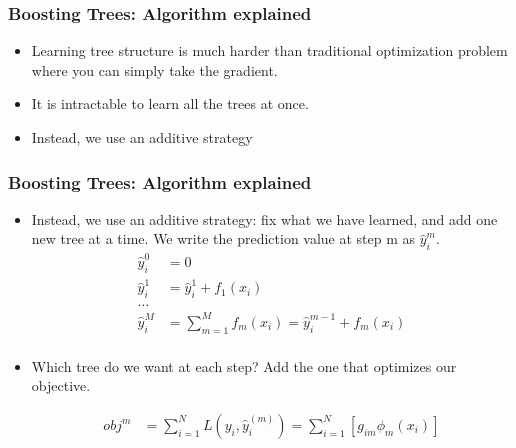 \documentclass[
  shownotes,
  xcolor={svgnames},
  hyperref={colorlinks,citecolor=DarkBlue,linkcolor=DarkRed,urlcolor=DarkBlue}
  , aspectratio=169]{beamer}
\begin{document}
\begin{frame}[fragile]
\frametitle{Boosting Trees: Algorithm explained}

\begin{itemize}
\item Learning tree structure is much harder than traditional optimization problem where you can simply take the gradient. 
\medskip
\item It is intractable to learn all the trees at once.
\medskip
\item Instead, we use an additive strategy
\end{itemize}

 \end{frame}
\begin{frame}[fragile]
\frametitle{Boosting Trees: Algorithm explained}

\begin{itemize} 
\item Instead, we use an additive strategy: fix what we have learned, and add one new tree at a time. We write the prediction value at step m as $\hat{y}_i^{m}$. 
\begin{align}
\hat{y}_i^{0} &=0 \\ \nonumber
\hat{y}_i^{1} &= \hat{y}_i^{1} + f_1(x_i) \\ \nonumber
\dots \\ \nonumber
\hat{y}_i^{M} &= \sum_{m=1}^M f_m(x_i) = \hat{y}_i^{m-1} + f_m(x_i) \\ \nonumber
\end{align}

\item Which tree do we want at each step?  Add the one that optimizes our objective.

\begin{align}
obj^m &= \sum_{i=1}^N L(y_i,\hat{y}_i^{(m)}) = \sum_{i=1}^N \left[ g_{im} \phi_m(x_i) \right]
\end{align}
\end{itemize}


 \end{frame}
\end{document}
